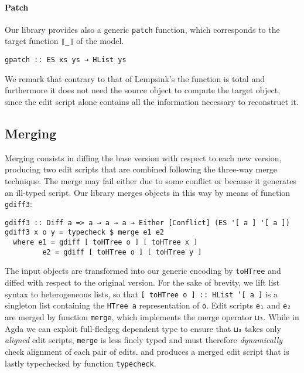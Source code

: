 \documentclass{sigplanconf}
\theoremstyle{plain}
\begin{document}
\paragraph{Patch}
Our library provides also a generic \texttt{patch} function, which corresponds
to the target function \texttt{⟦\_⟧} of the model.
\begin{verbatim}
gpatch :: ES xs ys → HList ys
\end{verbatim}

We remark that contrary to that of Lempsink's \cite{Lemp09} the
function is total and furthermore it does not need the source object to
compute the target object, since the edit script alone contains all
the information necessary to reconstruct it.

\subsection{Merging}
Merging consists in diffing the base version with respect to each new
version, producing two edit scripts that are combined following the
three-way merge technique.
%
The merge may fail either due to some conflict or because it generates
an ill-typed script.
%
Our library merges objects in this way by means of function \texttt{gdiff3}:
\begin{verbatim}
gdiff3 :: Diff a => a → a → a → Either [Conflict] (ES '[ a ] '[ a ])
gdiff3 x o y = typecheck $ merge e1 e2
  where e1 = gdiff [ toHTree o ] [ toHTree x ]
         e2 = gdiff [ toHTree o ] [ toHTree y ]
\end{verbatim}
The input objects are transformed into our generic encoding by
\texttt{toHTree} and diffed with respect to the original version.
%
For the sake of brevity, we lift list syntax to heterogeneous lists,
so that \texttt{[ toHTree o ] :: HList '[ a ]} is a singleton list
containing the \texttt{HTree a} representation of \texttt{o}.
%
Edit scripts \texttt{e₁} and \texttt{e₂} are merged by function
\texttt{merge}, which implements the merge operator \texttt{⊔₃}.
%
While in Agda we can exploit full-fledgeg dependent type to ensure
that \texttt{⊔₃} takes only \emph{aligned} edit scripts,
\texttt{merge} is less finely typed and must therefore
\emph{dynamically} check alignment of each pair of edits.
%
 and
produces a merged edit script that is lastly typechecked by function
\texttt{typecheck}.
%
\end{document}
